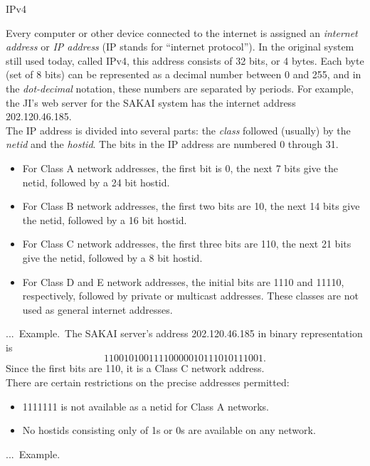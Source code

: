 \documentclass[smaller,hyperref={CJKbookmarks=true}]{beamer}
\newcounter{zhuo}[subsection]
\renewcommand{\thezhuo}{\thesection.\thesubsection.\arabic{zhuo}}
\newenvironment{EXAMPLE}{\stepcounter{zhuo}\alert{\!\thezhuo.~Example.\,}}{}
\begin{document}
\begin{frame}{IPv4}
\begin{spacing}{1.05}
Every computer or other device connected to the internet is assigned an
\emph{internet address} or \emph{IP address} (IP stands for ``internet protocol''). In the
original system still used today, called IPv4, this address consists of 32
bits, or 4 bytes. Each byte (set of 8 bits) can be represented as a decimal
number between 0 and 255, and in the \emph{dot-decimal} notation, these
numbers are separated by periods. For example, the JI's web server for the
SAKAI system has the internet address 202.120.46.185.\\[6pt]
The IP address is divided into several parts: the \emph{class} followed (usually) by
the \emph{netid} and the \emph{hostid}. The bits in the IP address are numbered 0
through 31.
\begin{itemize}
  \item For Class A network addresses, the first bit is 0, the next 7 bits give the netid, followed by a 24 bit hostid.
  \item For Class B network addresses, the first two bits are 10, the next 14 bits give the netid, followed by a 16 bit hostid.
  \item For Class C network addresses, the first three bits are 110, the next 21 bits give the netid, followed by a 8 bit hostid.
\end{itemize}
\newpage
\begin{itemize}
  \item For Class D and E network addresses, the initial bits are 1110 and 11110, respectively, followed by private or multicast addresses. These classes are not used as general internet addresses.
\end{itemize}
\begin{EXAMPLE}
The SAKAI server's address 202.120.46.185 in binary representation is
\[11001010011110000010111010111001.\]
Since the first bits are 110, it is a Class C network address.\\[5pt]
There are certain restrictions on the precise addresses permitted:
\begin{itemize}
  \item 1111111 is not available as a netid for Class A networks.
  \item No hostids consisting only  of 1s or 0s are available on any network.
\end{itemize}
\end{EXAMPLE}
\begin{EXAMPLE}

\end{EXAMPLE}
\end{spacing}
\end{frame}
\end{document}

